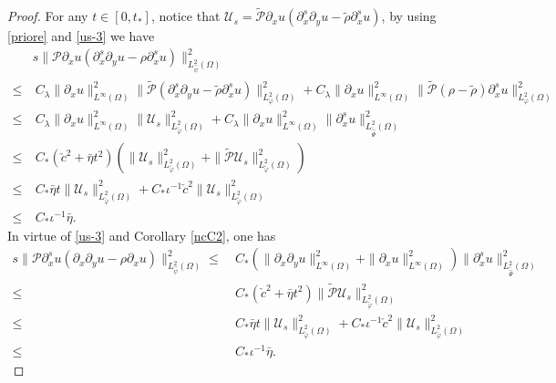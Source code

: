 \documentclass{amsart}
\numberwithin{equation}{section}
\begin{document}
\begin{proof}
For any $t\in[0,t_{*}]$, notice that $\mathcal{U}_{s}=\tilde{\mathcal{P}}\partial_{x}u(\partial_{x}^{s}\partial_{y}u-\tilde{\rho}\partial_{x}^{s}u)$,
by using \eqref{priore} and \eqref{us-3} we have
\begin{align}\label{pm21}
&s\|\mathcal{P}\partial_{x}u(\partial_{x}^{s}\partial_{y}u-\rho\partial_{x}^{s}u)\|_{L_{\hat{\psi}}^{2}(\Omega)}^{2}\\
\leq&~C_{\lambda}\|\partial_{x}u\|_{L^{\infty}(\Omega)}^{2}\|\tilde{\mathcal{P}}(\partial_{x}^{s}\partial_{y}u-\tilde{\rho}\partial_{x}^{s}u)\|_{L_{\varphi}^{2}(\Omega)}^{2}
     +C_{\lambda}\|\partial_{x}u\|_{L^{\infty}(\Omega)}^{2}\|\tilde{\mathcal{P}}(\rho-\tilde{\rho})\partial_{x}^{s}u\|_{L_{\varphi}^{2}(\Omega)}^{2}\nonumber\\
\leq&~C_{\lambda}\|\partial_{x}u\|_{L^{\infty}(\Omega)}^{2}\|\mathcal{U}_{s}\|_{L_{\tilde{\varphi}}^{2}(\Omega)}^{2}
     +C_{\lambda}\|\partial_{x}u\|_{L^{\infty}(\Omega)}^{2}\|\partial_{x}^{s}u\|_{L_{\tilde{\hat{\Psi}}}^{2}(\Omega)}^{2}\nonumber\\
\leq&~C_{*}(\check{c}^{2}+\bar{\eta}t^{2})(\|\mathcal{U}_{s}\|_{L_{\tilde{\varphi}}^{2}(\Omega)}^{2}
                                           +\|\tilde{\mathcal{P}}\mathcal{U}_{s}\|_{L_{\tilde{\varphi}}^{2}(\Omega)}^{2})\nonumber\\
\leq&~C_{*}\bar{\eta}t\|\mathcal{U}_{s}\|_{L_{\tilde{\varphi}}^{2}(\Omega)}^{2}
     +C_{*}\iota^{-1}\check{c}^{2}\|\mathcal{U}_{s}\|_{L_{\tilde{\varphi}}^{2}(\Omega)}^{2}\nonumber\\
\leq&~C_{*}\iota^{-1}\bar{\eta}.\nonumber
\end{align}
In virtue of \eqref{us-3} and Corollary \ref{ncC2}, one has
\begin{align}\label{pm22}
s\|\mathcal{P}\partial_{x}^{s}u(\partial_{x}\partial_{y}u-\rho\partial_{x}u)\|_{L_{\hat{\psi}}^{2}(\Omega)}^{2}
\leq&~C_{*}\left(\|\partial_{x}\partial_{y}u\|_{L^{\infty}(\Omega)}^{2}+\|\partial_{x}u\|_{L^{\infty}(\Omega)}^{2}\right)
          \|\partial_{x}^{s}u\|_{L_{\tilde{\hat{\Psi}}}^{2}(\Omega)}^{2}\\
\leq&~C_{*}(\check{c}^{2}+\bar{\eta}t^{2})\|\tilde{\mathcal{P}}\mathcal{U}_{s}\|_{L_{\tilde{\varphi}}^{2}(\Omega)}^{2}\nonumber\\
\leq&~C_{*}\bar{\eta}t\|\mathcal{U}_{s}\|_{L_{\tilde{\varphi}}^{2}(\Omega)}^{2}
     +C_{*}\iota^{-1}\check{c}^{2}\|\mathcal{U}_{s}\|_{L_{\tilde{\varphi}}^{2}(\Omega)}^{2}\nonumber\\
\leq&~C_{*}\iota^{-1}\bar{\eta}.\nonumber
\end{align}

\end{proof}
\end{document}
